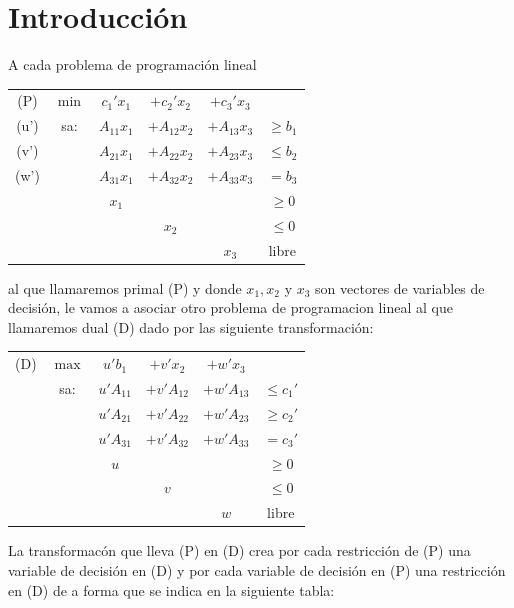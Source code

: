 \documentclass[PM.tex]{subfiles}
\begin{document}
\section{Introducción}
A cada problema de programación lineal

\begin{center}
\begin{tabular}{cccccc}
(P) & $\min$ & $c_1'x_1$ & $+c_2'x_2$   & $+c_3'x_3$\\
(u') & sa: & $A_{11}x_1$ & $+A_{12}x_2$ & $+ A_{13}x_3$ & $≥ b_1$\\
(v') &     & $A_{21}x_1$ & $+A_{22}x_2$ & $+ A_{23}x_3$ & $≤ b_2$\\
(w') &     & $A_{31}x_1$ & $+A_{32}x_2$ & $+ A_{33}x_3$ & $= b_3$\\
     &     &       $x_1$ &              &               & $≥ 0$\\
     &     &             &      $x_2$   &               & $≤ 0$\\
     &     &             &              &         $x_3$ & libre
\end{tabular}
\end{center}
al que llamaremos primal (P) y donde $x_1, x_2$ y $x_3$ son vectores de variables de decisión, le vamos a asociar otro problema de programacion lineal al que llamaremos dual (D) dado por las siguiente transformación:

\begin{center}
\begin{tabular}{cccccc}
(D) & $\max$ & $u'b_1$ & $+v'x_2$ & $+w'x_3$\\
    & sa: & $u'A_{11}$ & $+v'A_{12}$ & $+w'A_{13}$ & $≤ c_1'$\\
    &     & $u'A_{21}$ & $+v'A_{22}$ & $+w'A_{23}$ & $≥ c_2'$\\
    &     & $u'A_{31}$ & $+v'A_{32}$ & $+w'A_{33}$ & $= c_3'$\\
    &     &       $u$  &             &             & $≥ 0$\\
    &     &            &      $v$    &             & $≤ 0$\\
    &     &            &             &      $w$    & libre
\end{tabular}
\end{center}

La transformacón que lleva (P) en (D) crea por cada restricción de (P) una variable de decisión en (D) y por cada variable de decisión en (P) una restricción en (D) de a forma que se indica en la siguiente tabla:
\end{document}
